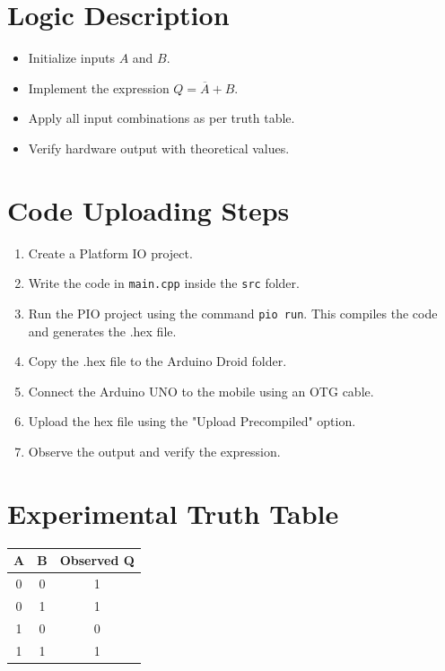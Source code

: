 \documentclass[12pt]{article}
\begin{document}

\section*{\color{blue}Logic Description}

\begin{itemize}
\item Initialize inputs $A$ and $B$.
\item Implement the expression $Q = \overline{A} + B$.
\item Apply all input combinations as per truth table.
\item Verify hardware output with theoretical values.
\end{itemize}


\section*{\color{blue}Code Uploading Steps}

\begin{enumerate}
\item Create a Platform IO project.
\item Write the code in \texttt{main.cpp} inside the \texttt{src} folder.
\item Run the PIO project using the command \texttt{pio run}. This compiles the code and generates the .hex file.
\item Copy the .hex file to the Arduino Droid folder.
\item Connect the Arduino UNO to the mobile using an OTG cable.
\item Upload the hex file using the "Upload Precompiled" option.
\item Observe the output and verify the expression.
\end{enumerate}


\section*{\color{blue}Experimental Truth Table}

\begin{center}
\begin{tabular}{|c|c|c|}
\hline
A & B & Observed Q \\
\hline
0 & 0 & 1 \\
0 & 1 & 1 \\
1 & 0 & 0 \\
1 & 1 & 1 \\
\hline
\end{tabular}
\end{center}
\end{document}
